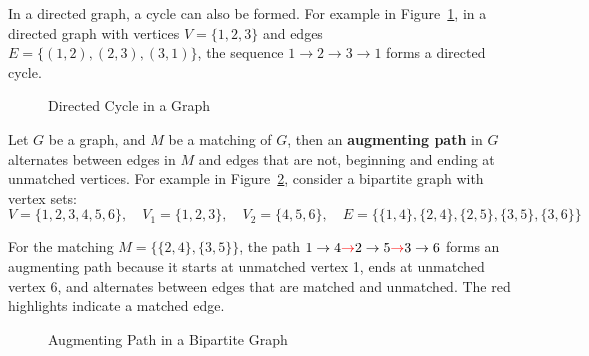 In a directed graph, a cycle can also be formed. For example in Figure~\ref{fig:directed_cycle}, in a directed graph with vertices \( V = \{1, 2, 3\} \) and edges \( E = \{(1, 2), (2, 3), (3, 1)\} \), the sequence \( 1 \to 2 \to 3 \to 1 \) forms a directed cycle.

\begin{figure}[h]
\begin{center}
\caption{Directed Cycle in a Graph}
\label{fig:directed_cycle}
\end{center}
\end{figure}

Let $G$ be a graph, and $M$ be a matching of $G$, then an \textbf{augmenting path} in $G$ alternates between edges in $M$ and edges that are not, beginning and ending at unmatched vertices.\cite{cormen2009introduction} For example in Figure~\ref{fig:augmenting_path}, consider a bipartite graph with vertex sets: 
\[ V = \{1, 2, 3, 4, 5, 6\}, \quad V_1 = \{1, 2, 3\}, \quad V_2 = \{4, 5, 6\}, \quad E = \{\{1, 4\}, \{2, 4\}, \{2, 5\}, \{3, 5\}, \{3, 6\}\} \] 

For the matching \( M = \{\{2, 4\}, \{3, 5\}\} \), the path \( 1 \to 4 \textcolor{red}{ \to} 2 \to 5 \textcolor{red}{ \to} 3 \to 6 \) forms an augmenting path because it starts at unmatched vertex 1, ends at unmatched vertex 6, and alternates between edges that are matched and unmatched. The red highlights indicate a matched edge.

\begin{figure}[h]
\begin{center}
\caption{Augmenting Path in a Bipartite Graph}
\label{fig:augmenting_path}
\end{center}
\end{figure}

